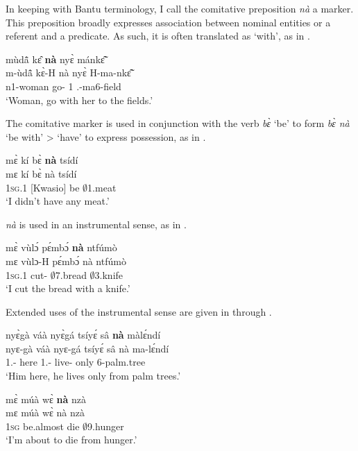 In keeping with Bantu terminology, I call the  comitative preposition {\itshape nà} a marker. This preposition broadly expresses association between nominal entities or a referent and a predicate.  As such, it is often translated as `with', as in .

\ea \label{COM1}
  \glll mùdã̂ kɛ̂ {\bfseries nà} nyɛ̀ mánkɛ̃̂ \\
       m-ùdã̂ kɛ̀-H nà nyɛ̀ H-ma-nkɛ̃̂ \\
         n1-woman go-{\R} {\COM} 1 {\OBJ}.{\LINK}-ma6-field  \\
    \trans `Woman, go with her to the fields.'
\z

The comitative marker is used in conjunction with the verb {\itshape bɛ̀} `be' to form {\itshape bɛ̀ nà} `be with' > `have'  to express possession, as in .

\ea \label{COM2}
  \glll mɛ̀ kí bɛ̀ {\bfseries nà} tsídí \\
       mɛ kí bɛ̀ nà tsídí \\
       1\textsc{sg}.{\PST}1 {\NEG}[Kwasio] be {\COM} $\emptyset$1.meat  \\
    \trans `I didn't have any meat.'
\z

{\itshape nà} is used in an instrumental sense, as in .

\ea \label{COM3a}
  \glll mɛ̀ vùlɔ́ pɛ́mbɔ́ {\bfseries nà} ntfúmò \\
       mɛ vùlɔ-H pɛ́mbɔ́ nà ntfúmò  \\
       1\textsc{sg}.{\PST}1 cut-{\R} $\emptyset$7.bread {\COM} $\emptyset$3.knife  \\
    \trans `I cut the bread with a knife.'
\z

\noindent Extended uses of the instrumental sense are given in  through .

\ea \label{COM3}
  \glll nyɛ̀gà váà nyɛ̀gá tsíyɛ́ sâ {\bfseries nà} màlɛ́ndí \\
         nyɛ-gà váà nyɛ-gá tsíyɛ́ sâ nà ma-lɛ́ndí \\
          1.{\SBJ}-{\CONTR} here 1.{\SBJ}-{\CONTR} live-{\R} only {\COM} 6-palm.tree \\
    \trans `Him here, he lives only from palm trees.'
\z

\ea \label{COM4}
  \glll  mɛ̀ múà wɛ̀ {\bfseries nà} nzà \\
        mɛ múà wɛ̀ nà nzà \\
          1\textsc{sg} be.almost die {\COM} $\emptyset$9.hunger  \\
    \trans `I'm about to die from hunger.'
\z

